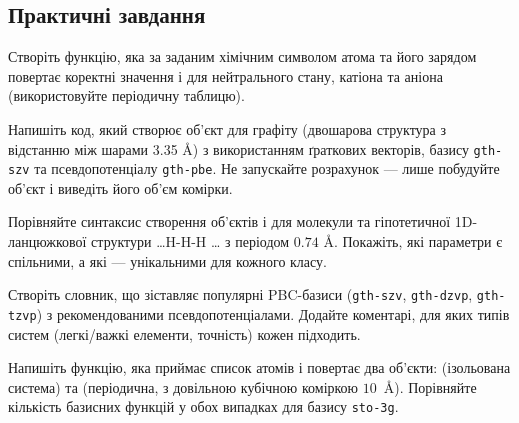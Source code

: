 \subsection*{Практичні завдання}
\begin{tasks}
	\item Створіть функцію, яка за заданим хімічним символом атома та його зарядом повертає коректні значення  і  для нейтрального стану, катіона та аніона (використовуйте періодичну таблицю).
	\item Напишіть код, який створює об’єкт  для графіту (двошарова структура з відстанню між шарами 3.35 \AA) з використанням ґраткових векторів, базису \texttt{gth-szv} та псевдопотенціалу \texttt{gth-pbe}. Не запускайте розрахунок --- лише побудуйте об’єкт і виведіть його об’єм комірки.
	\item Порівняйте синтаксис створення об’єктів  і  для молекули  та гіпотетичної 1D-ланцюжкової структури {\ldots H-H-H \ldots} з періодом $0.74$ \AA. Покажіть, які параметри є спільними, а які --- унікальними для кожного класу.
	\item Створіть словник, що зіставляє популярні PBC-базиси (\texttt{gth-szv}, \texttt{gth-dzvp}, \texttt{gth-tzvp}) з рекомендованими псевдопотенціалами. Додайте коментарі, для яких типів систем (легкі/важкі елементи, точність) кожен підходить.
	\item Напишіть функцію, яка приймає список атомів і повертає два об’єкти:  (ізольована система) та  (періодична, з довільною кубічною коміркою $10$~\AA). Порівняйте кількість базисних функцій у обох випадках для базису \texttt{sto-3g}.
\end{tasks}


